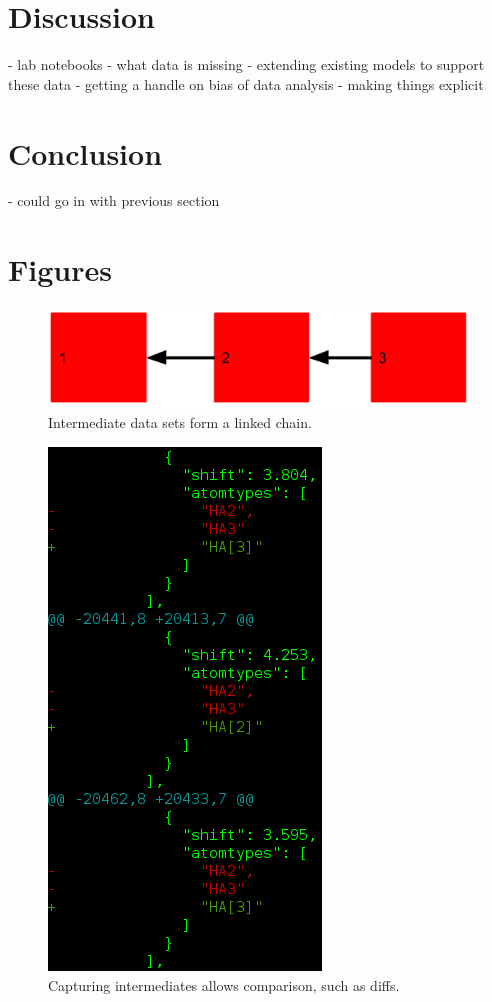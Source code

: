 \section{Discussion}
 - lab notebooks
 - what data is missing
 - extending existing models to support these data
 - getting a handle on bias of data analysis
 - making things explicit


\section{Conclusion}
 - could go in with previous section


\clearpage
\section{Figures}

\begin{figure}[h]
  \includegraphics[scale=0.5]{figures/intermediates}
  \caption{Intermediate data sets form a linked chain.}
  \label{intermediates}
\end{figure}

\begin{figure}
  \includegraphics[scale=0.5]{figures/diff}
  \caption{Capturing intermediates allows comparison, such as diffs.}
  \label{diff}
\end{figure}

